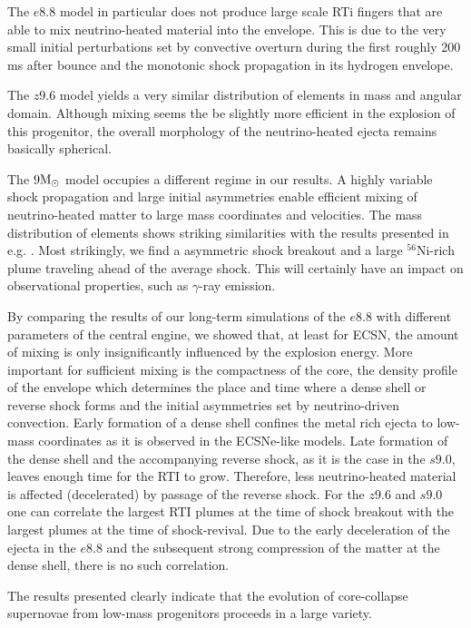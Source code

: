 \documentclass[fleqn,usenatbib]{mnras}
\newcommand{\nickel}{\ensuremath{\mathrm{^{56}Ni}}\xspace}
\newcommand{\solm}{\ensuremath{\rm{M_{\odot}}}\xspace}
\begin{document}
The $e8.8$ model in particular does not produce large scale RTi fingers 
that are able to mix neutrino-heated material into the envelope. This is 
due to the very small initial perturbations set by convective overturn 
during the first roughly 200 ms after bounce and the monotonic shock 
propagation in its hydrogen envelope. 

The $z9.6$ model yields a very similar distribution of elements in mass 
and angular domain. Although mixing seems the be slightly more efficient
in the explosion of this progenitor, the overall morphology of the neutrino-heated
ejecta remains basically spherical.

The $9\solm$ model occupies a different regime in our results. 
A highly variable shock propagation and large initial asymmetries
enable efficient mixing of neutrino-heated matter to large
mass coordinates and velocities. The mass distribution of elements
shows striking similarities with the results presented in e.g.
\cite{Wongwathanarat2015}. 
Most strikingly, we find a asymmetric shock breakout and a large
$\nickel$-rich plume traveling ahead of the average shock. 
This will certainly have an impact on observational properties,
such as $\gamma$-ray emission.

By comparing the results of our long-term simulations of the $e8.8$ 
with different parameters of the central engine, we showed that, 
at least for ECSN, the amount of mixing is only insignificantly 
influenced by the explosion energy. 
More important for sufficient mixing is the compactness of the core, 
the density profile of the envelope which determines the place and 
time where a dense shell or reverse shock forms and the initial 
asymmetries set by neutrino-driven convection.
Early formation of a dense shell confines the metal rich ejecta to 
low-mass coordinates as it is observed in the ECSNe-like models. 
Late formation of the dense shell and the accompanying reverse shock, 
as it is the case in the $s9.0$, leaves enough time for the RTI to grow. 
Therefore, less neutrino-heated material is affected (decelerated)
by passage of the reverse shock.
For the $z9.6$ and $s9.0$ one can correlate the largest RTI plumes at 
the time of shock breakout with the largest plumes at the time of shock-revival. 
Due to the early deceleration of the ejecta in the $e8.8$ and the subsequent 
strong compression of the matter at the dense shell, there is no such correlation. 

The results presented clearly indicate that the evolution of 
core-collapse supernovae from low-mass progenitors proceeds in a large variety. 
\end{document}
